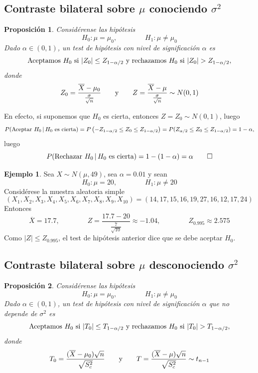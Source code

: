 \documentclass[11pt]{report}
\makeatletter
\renewenvironment{proof}[1][\proofname]{\par
  \pushQED{\qed}%
  \normalfont \topsep\z@skip %
  \trivlist
  \item[\hskip\labelsep
        \itshape
    #1\@addpunct{.}]\ignorespaces
}{%
  \popQED\endtrivlist\@endpefalse
}
\newtheorem{proposition}{Proposición}
\theoremstyle{definition}
\newtheorem{example}{Ejemplo}
\makeatother
\begin{document}
\subsection{Contraste bilateral sobre \texorpdfstring{$\mu$}{TEXT} conociendo \texorpdfstring{$\sigma^2$}{TEXT}}
\begin{proposition}
    Considérense las hipótesis
    \[H_0 \colon \mu = \mu_0, \qquad \qquad H_1 \colon \mu \neq \mu_0\]
    Dado $\alpha \in (0,1)$, un test de hipótesis con nivel de significación $\alpha$ es
    \[\textup{{Aceptamos} } H_0 \textup{ {si} } |Z_0| \leq Z_{1-\alpha/2} \textup{ {y rechazamos} } H_0 \textup{ {si} } |Z_{0}| > Z_{1-\alpha/2},\]
    donde
    \[Z_{0} = \frac{\overline{X}-\mu_0}{\frac{\sigma}{\sqrt{n}}} \qquad \textup{y} \qquad Z =  \frac{\overline{X}-\mu}{\frac{\sigma}{\sqrt{n}}} \sim N(0,1)\]
\end{proposition}

\begin{proof}
    En efecto, si suponemos que $H_0$ es cierta, entonces $Z = Z_0 \sim N(0,1)$, luego
    \[P(\textup{Aceptar } H_0 \, | \, H_0 \textup{ es cierta}) = P\left(-Z_{1-\alpha/2} \leq Z_0 \leq Z_{1-\alpha/2}\right) = P(Z_{\alpha/2} \leq Z_0 \leq Z_{1-\alpha/2}) = 1-\alpha,\]
    luego
    \[P(\textup{Rechazar } H_0 \, | \, H_0 \textup{ es cierta}) = 1-(1-\alpha) = \alpha \qedhere\]
\end{proof}

\begin{example}
Sea $X \sim N(\mu, 49)$, sea $\alpha=0.01$ y sean
\[H_0 \colon \mu = 20, \qquad \qquad H_1 \colon \mu \neq 20\]
Considérese la muestra aleatoria simple
\[(X_1,X_2,X_3,X_4,X_5,X_6,X_7,X_8,X_9,X_{10}) = (14,17,15,16,19,27,16,12,17,24)\]
Entonces
\[\overline{X} = 17.7, \qquad \qquad Z = \frac{17.7-20}{\frac{7}{\sqrt{10}}} \approx -1.04, \qquad \qquad Z_{0.995} \approx 2.575\]
Como $|Z| \leq Z_{0.995}$, el test de hipótesis anterior dice que se debe aceptar $H_0$.
\end{example}

\subsection{Contraste bilateral sobre \texorpdfstring{$\mu$}{TEXT} desconociendo \texorpdfstring{$\sigma^2$}{TEXT}}

\begin{proposition}
\label{prop37}
    Considérense las hipótesis
    \[H_0 \colon \mu = \mu_0, \qquad \qquad H_1 \colon \mu \neq \mu_0\]
    Dado $\alpha \in (0,1)$, un test de hipótesis con nivel de significación $\alpha$ que no depende de $\sigma^2$ es
    \[\textup{{Aceptamos} } H_0 \textup{ {si} } |T_0| \leq T_{1-\alpha/2} \textup{ {y rechazamos} } H_0 \textup{ {si} } |T_0| > T_{1-\alpha/2},\]
    donde
    \[T_0 = \frac{(\overline{X}-\mu_0)\sqrt{n}}{\sqrt{S^2_c}} \qquad \textup{y} \qquad T = \frac{(\overline{X}-\mu)\sqrt{n}}{\sqrt{S^2_c}} \sim t_{n-1}\]
\end{proposition}
\end{document}
